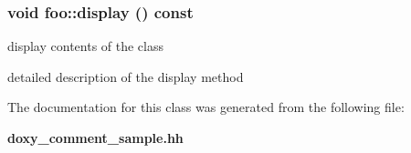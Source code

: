 \subsubsection{\setlength{\rightskip}{0pt plus 5cm}void foo::display () const}\label{classfoo_5395444e1431692a1551c59ccb89ca06}


display contents of the class 

detailed description of the display method 

The documentation for this class was generated from the following file:\begin{CompactItemize}
\item 
{\bf doxy\_\-comment\_\-sample.hh}\end{CompactItemize}
